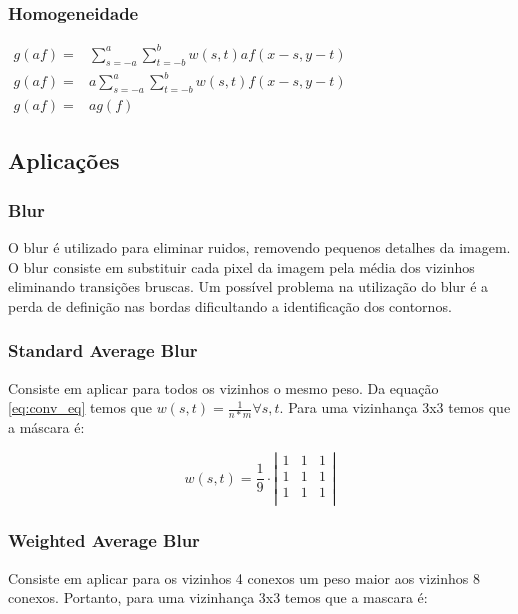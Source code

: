 \documentclass[10pt,a4paper]{article}
\begin{document}
\subsubsection{Homogeneidade}
\begin{center}
    $\begin{aligned}
        g(a f) = &\sum_{s = -a}^{a}\sum_{t = -b}^{b}w(s,t) a f(x - s, y - t) \\
        g(a f) = &a \sum_{s = -a}^{a}\sum_{t = -b}^{b}w(s,t) f(x - s, y - t) \\
        g(a f) = &a g(f)
    \end{aligned}$
\end{center}

\newpage

\subsection{Aplicações}
\subsubsection{Blur}
O blur é utilizado para eliminar ruidos, removendo pequenos detalhes da imagem. O blur consiste em substituir cada pixel da imagem pela média dos vizinhos eliminando transições bruscas. Um possível problema na utilização do blur é a perda de definição nas bordas dificultando a identificação dos contornos.

\subsubsection*{Standard Average Blur}
Consiste em aplicar para todos os vizinhos o mesmo peso. Da equação \ref{eq:conv_eq} temos que $w(s,t) = \frac{1}{n * m} \forall s,t$. Para uma vizinhança 3x3 temos que a máscara é:

\[ w(s,t) = \frac{1}{9} \cdot \left|
    \begin{array}{ccc}
        1 & 1 & 1 \\
        1 & 1 & 1 \\
        1 & 1 & 1 \\
\end{array}\right|\]

\subsubsection*{Weighted Average Blur}
Consiste em aplicar para os vizinhos 4 conexos um peso maior aos vizinhos 8 conexos. Portanto, para uma vizinhança 3x3 temos que a mascara é:
\end{document}
